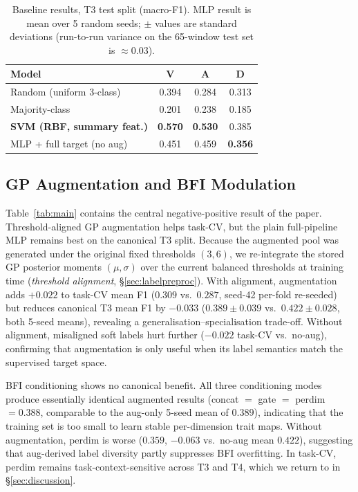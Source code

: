 \documentclass[sigconf,review,anonymous]{acmart}
\newcommand{\best}[1]{\textbf{\textcolor{bestcol}{#1}}}
\begin{document}
\begin{table}[t]
\caption{Baseline results, T3 test split (macro-F1). MLP result is mean over 5
  random seeds; $\pm$ values are standard deviations (run-to-run variance on the
  65-window test set is ${\approx}0.03$).}
\label{tab:baselines}
\centering
\begin{tabular}{lccc}
\toprule
\textbf{Model} & \textbf{V} & \textbf{A} & \textbf{D} \\
\midrule
Random (uniform 3-class) & 0.394 & 0.284 & 0.313 \\
Majority-class           & 0.201 & 0.238 & 0.185 \\
\best{SVM (RBF, summary feat.)} & \best{0.570} & \best{0.530} & 0.385 \\
MLP + full target (no aug)   & 0.451 & 0.459 & \best{0.356} \\
\bottomrule
\end{tabular}
\end{table}

\subsection{GP Augmentation and BFI Modulation}
\label{sec:mainresults}

Table~\ref{tab:main} contains the central negative-positive result of the
paper.
Threshold-aligned GP augmentation helps task-CV, but the plain full-pipeline MLP
remains best on the canonical T3 split.
Because the augmented pool was generated under the original fixed thresholds
$(3, 6)$, we re-integrate the stored GP posterior moments $(\mu, \sigma)$ over
the current balanced thresholds
at training time (\emph{threshold alignment}, §\ref{sec:labelpreproc}).
With alignment, augmentation adds $+0.022$ to task-CV mean F1
($0.309$ vs.\ $0.287$, seed-42 per-fold re-seeded) but reduces canonical T3
mean F1 by $-0.033$ ($0.389 \pm 0.039$ vs.\ $0.422 \pm 0.028$, both 5-seed
means), revealing a generalisation--specialisation trade-off.
Without alignment, misaligned soft labels hurt further
($-0.022$ task-CV vs.\ no-aug), confirming that augmentation is only useful
when its label semantics match the supervised target space.

BFI conditioning shows no canonical benefit.
All three conditioning modes produce essentially identical augmented results
(concat $=$ gate $=$ perdim $= 0.388$, comparable to the aug-only 5-seed mean
of $0.389$), indicating that the training set is too small to learn stable
per-dimension trait maps.
Without augmentation, perdim is worse ($0.359$, $-0.063$ vs.\ no-aug
mean $0.422$), suggesting that aug-derived label diversity partly suppresses
BFI overfitting.
In task-CV, perdim remains task-context-sensitive across T3 and T4, which we
return to in §\ref{sec:discussion}.
\end{document}
